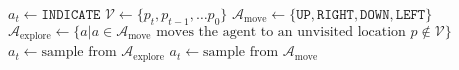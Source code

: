 \begin{algorithmic}
        \State \(a_t \leftarrow \mathtt{INDICATE}\)
    \Else
        \State \(\mathcal{V} \leftarrow \{p_t, p_{t-1}, \dots p_0\}\)
        \State \(\mathcal{A}_{\text{move}} \leftarrow \{\mathtt{UP}, \mathtt{RIGHT}, \mathtt{DOWN}, \mathtt{LEFT}\}\)
        \State \(\mathcal{A}_{\text{explore}} \leftarrow \{a | a \in \mathcal{A}_{\text{move}} \text{ moves the agent to an unvisited location } p \notin \mathcal{V}\}\) 
            \State \(a_t \leftarrow \text{sample from } \mathcal{A}_{\text{explore}}\)
        \Else
            \State \(a_t \leftarrow \text{sample from } \mathcal{A}_{\text{move}}\)
        \EndIf
    \EndIf
\end{algorithmic}